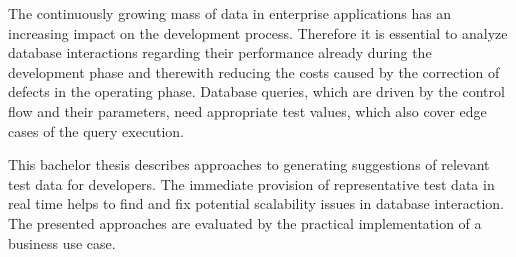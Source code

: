 {
The continuously growing mass of data in enterprise applications has an increasing impact on the development process.
Therefore it is essential to analyze database interactions regarding their performance already during the development phase and therewith reducing the costs caused by the correction of defects in the operating phase.
Database queries, which are driven by the control flow and their parameters, need appropriate test values, which also cover edge cases of the query execution.

This bachelor thesis describes approaches to generating suggestions of relevant test data for developers.
The immediate provision of representative test data in real time helps to find and fix potential scalability issues in database interaction.
The presented approaches are evaluated by the practical implementation of a business use case.

}
